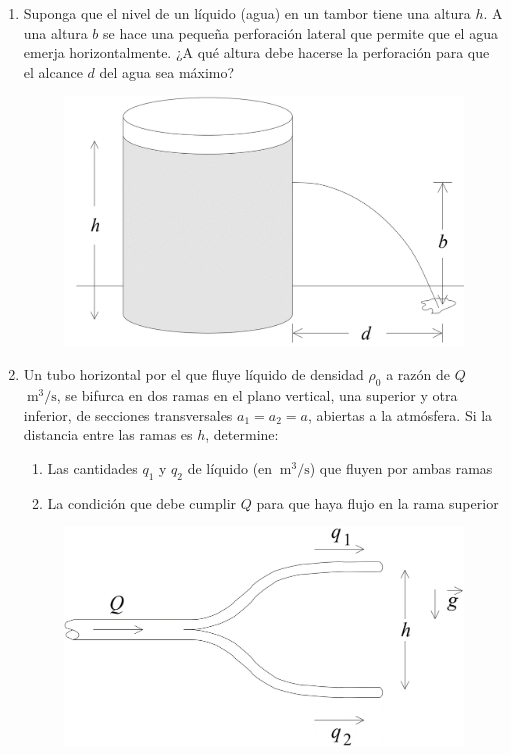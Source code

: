 \documentclass[letterpaper,11pt]{article}
\begin{document}
\begin{enumerate}
\item 
\begin{multicols}{2}
    Suponga que el nivel de un líquido (agua) en un tambor tiene una altura $h$. A una altura $b$ se hace una pequeña perforación lateral que permite que el agua emerja horizontalmente. ¿A qué altura debe hacerse la perforación para que el alcance $d$ del agua sea máximo?
    
    \columnbreak
    
    \begin{figure}[H]
        \centering
        \includegraphics[width=0.55\linewidth]{2021-2/img/aux14/tambor.png}
    \end{figure}
\end{multicols}

\item Un tubo horizontal por el que fluye líquido de densidad $\rho_0$ a razón de $Q$~$\SI{}{\meter^3\per\second}$, se bifurca en dos ramas en el plano vertical, una superior y otra inferior, de secciones transversales $a_1=a_2=a$, abiertas a la atmósfera. Si la distancia entre las ramas es $h$, determine:
    \begin{enumerate}
        \item Las cantidades $q_1$ y $q_2$ de líquido (en $\SI{}{\meter^3\per\second}$) que fluyen por ambas ramas
        \item La condición que debe cumplir $Q$ para que haya flujo en la rama superior
    \end{enumerate}
    
    \begin{figure}[H]
        \centering
        \includegraphics[width=0.3\linewidth]{2021-2/img/aux14/y.png}
    \end{figure}



%       
\end{enumerate}
\end{document}
